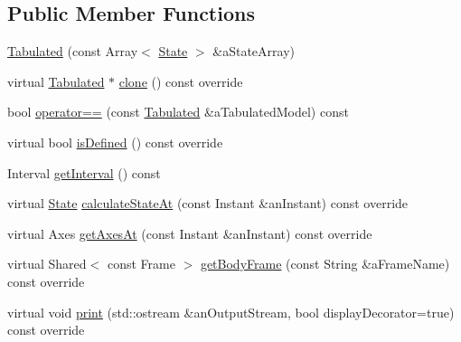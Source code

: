 \subsection*{Public Member Functions}
\begin{DoxyCompactItemize}
\item 
\hyperlink{classostk_1_1astro_1_1flight_1_1profile_1_1models_1_1_tabulated_a68153fb9d50b8ed216c5635304a2f433}{Tabulated} (const Array$<$ \hyperlink{classostk_1_1astro_1_1flight_1_1profile_1_1_state}{State} $>$ \&a\+State\+Array)
\item 
virtual \hyperlink{classostk_1_1astro_1_1flight_1_1profile_1_1models_1_1_tabulated}{Tabulated} $\ast$ \hyperlink{classostk_1_1astro_1_1flight_1_1profile_1_1models_1_1_tabulated_a1c9f4f5711ac2ae0cc545d89b0ee4d53}{clone} () const override
\item 
bool \hyperlink{classostk_1_1astro_1_1flight_1_1profile_1_1models_1_1_tabulated_a45e872950f1a20fad948295fb6b9ac7f}{operator==} (const \hyperlink{classostk_1_1astro_1_1flight_1_1profile_1_1models_1_1_tabulated}{Tabulated} \&a\+Tabulated\+Model) const
\item 
virtual bool \hyperlink{classostk_1_1astro_1_1flight_1_1profile_1_1models_1_1_tabulated_ad830d557475ca2ba83d43659e348b1d6}{is\+Defined} () const override
\item 
Interval \hyperlink{classostk_1_1astro_1_1flight_1_1profile_1_1models_1_1_tabulated_abf25afb50a324162903488374c4df078}{get\+Interval} () const
\item 
virtual \hyperlink{classostk_1_1astro_1_1flight_1_1profile_1_1_state}{State} \hyperlink{classostk_1_1astro_1_1flight_1_1profile_1_1models_1_1_tabulated_af27ea0e7006d0de18e897a9a5c7a0fb2}{calculate\+State\+At} (const Instant \&an\+Instant) const override
\item 
virtual Axes \hyperlink{classostk_1_1astro_1_1flight_1_1profile_1_1models_1_1_tabulated_ac85970f439c8db0684c9349601c226d2}{get\+Axes\+At} (const Instant \&an\+Instant) const override
\item 
virtual Shared$<$ const Frame $>$ \hyperlink{classostk_1_1astro_1_1flight_1_1profile_1_1models_1_1_tabulated_a1be1d71748e4e0b59bd3dd2334b759fe}{get\+Body\+Frame} (const String \&a\+Frame\+Name) const override
\item 
virtual void \hyperlink{classostk_1_1astro_1_1flight_1_1profile_1_1models_1_1_tabulated_a0e3d34c39a644279a9b958c3fd9bf730}{print} (std\+::ostream \&an\+Output\+Stream, bool display\+Decorator=true) const override
\end{DoxyCompactItemize}

